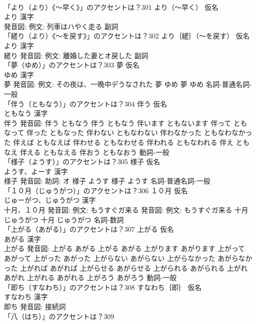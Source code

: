 \documentclass[8pt]{extreport}
\begin{document}
\begin{CJK}{UTF8}{min}
\\	「より（より）《〜早く》」のアクセントは？301	より（〜早く） 仮名　
\\	より 漢字　
\\	発音図: 例文: 列車はハやく走る							副詞 
\\	「縒り（より）《〜を戻す》」のアクセントは？302	より｛縒｝（〜を戻す） 仮名　
\\	より 漢字　
\\	縒り 発音図: 例文: 離婚した妻とオ戻した							副詞 
\\	「夢（ゆめ）」のアクセントは？303	夢 仮名　
\\	ゆめ 漢字　
\\	夢 発音図: 例文: その夜は、一晩中デうなされた	夢 ゆめ		夢 ゆめ				名詞-普通名詞-一般 
\\	「伴う（ともなう）」のアクセントは？304	伴う 仮名　
\\	ともなう 漢字　
\\	伴う 発音図:	伴う ともなう		伴う ともなう 伴います ともないます 伴って ともなって 伴った ともなった 伴わない ともなわない 伴わなかった ともなわなかった 伴えば ともなえば 伴わせる ともなわせる 伴われる ともなわれる 伴え ともなえ 伴える ともなえる 伴おう ともなおう				動詞-一般 
\\	「様子（ようす）」のアクセントは？305	様子 仮名　
\\	ようす、よーす 漢字　
\\	様子 発音図: 助詞: オ	様子 ようす		様子 ようす				名詞-普通名詞-一般 
\\	「１０月（じゅうがつ）」のアクセントは？306	１０月 仮名　
\\	じゅーがつ、じゅうがつ 漢字　
\\	十月、１０月 発音図: 例文: もうすぐガ来る 発音図: 例文: もうすぐガ来る	十月 じゅうがつ		十月 じゅうがつ				名詞-数詞 
\\	「上がる（あがる）」のアクセントは？307	上がる 仮名　
\\	あがる 漢字　
\\	上がる 発音図:	上がる あがる		上がる あがる 上がります あがります 上がって あがって 上がった あがった 上がらない あがらない 上がらなかった あがらなかった 上がれば あがれば 上がらせる あがらせる 上がられる あがられる 上がれ あがれ 上がれる あがれる 上がろう あがろう				動詞-一般 
\\	「即ち（すなわち）」のアクセントは？308	すなわち｛即｝ 仮名　
\\	すなわち 漢字　
\\	即ち 発音図:							接続詞 
\\	「八（はち）」のアクセントは？309	

\end{CJK}
\end{document}
